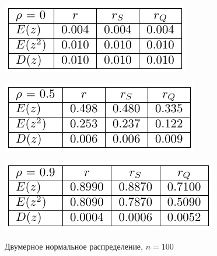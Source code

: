 \documentclass[a4paper]{article}
\begin{document}
\begin{table}[H]
    \begin{center}
    \includegraphics[]{LabSrcs/resources/100rho0.pdf}
    \end{center}
    \begin{center}
    \includegraphics[]{LabSrcs/resources/100rho0.5.pdf}
    \end{center}
    \begin{center}
    \includegraphics[]{LabSrcs/resources/100rho0.9.pdf}
    \end{center}
    \caption{Двумерное нормальное распределение, $n=100$}
    \label{tab:norm100}
\end{table}
\end{document}
